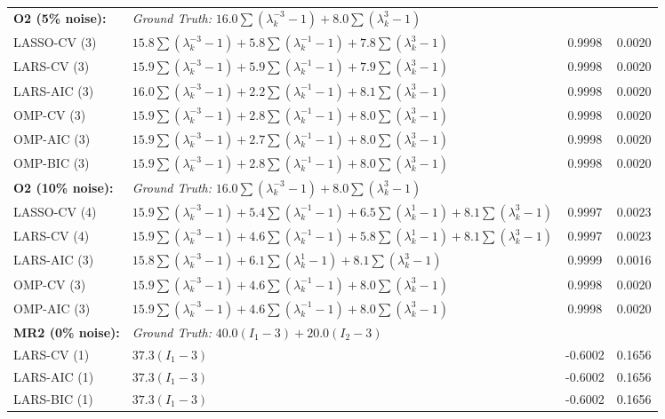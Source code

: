 \documentclass[11pt,a4paper]{article}
\begin{document}
{\begin{longtable}{@{}l l cc@{}}
\textbf{O2 (5\% noise):} & \multicolumn{3}{l}{\textit{Ground Truth: } $16.0 \sum (\lambda_k^{-3} - 1) + 8.0 \sum (\lambda_k^{3} - 1)$} \\
LASSO-CV (3) & $15.8 \sum (\lambda_k^{-3} - 1) + 5.8 \sum (\lambda_k^{-1} - 1) + 7.8 \sum (\lambda_k^{3} - 1)$ & 0.9998 & 0.0020 \\
LARS-CV (3) & $15.9 \sum (\lambda_k^{-3} - 1) + 5.9 \sum (\lambda_k^{-1} - 1) + 7.9 \sum (\lambda_k^{3} - 1)$ & 0.9998 & 0.0020 \\
LARS-AIC (3) & $16.0 \sum (\lambda_k^{-3} - 1) + 2.2 \sum (\lambda_k^{-1} - 1) + 8.1 \sum (\lambda_k^{3} - 1)$ & 0.9998 & 0.0020 \\
OMP-CV (3) & $15.9 \sum (\lambda_k^{-3} - 1) + 2.8 \sum (\lambda_k^{-1} - 1) + 8.0 \sum (\lambda_k^{3} - 1)$ & 0.9998 & 0.0020 \\
OMP-AIC (3) & $15.9 \sum (\lambda_k^{-3} - 1) + 2.7 \sum (\lambda_k^{-1} - 1) + 8.0 \sum (\lambda_k^{3} - 1)$ & 0.9998 & 0.0020 \\
OMP-BIC (3) & $15.9 \sum (\lambda_k^{-3} - 1) + 2.8 \sum (\lambda_k^{-1} - 1) + 8.0 \sum (\lambda_k^{3} - 1)$ & 0.9998 & 0.0020 \\
\midrule

\textbf{O2 (10\% noise):} & \multicolumn{3}{l}{\textit{Ground Truth: } $16.0 \sum (\lambda_k^{-3} - 1) + 8.0 \sum (\lambda_k^{3} - 1)$} \\
LASSO-CV (4) & $15.9 \sum (\lambda_k^{-3} - 1) + 5.4 \sum (\lambda_k^{-1} - 1) + 6.5 \sum (\lambda_k^{1} - 1) + 8.1 \sum (\lambda_k^{3} - 1)$ & 0.9997 & 0.0023 \\
LARS-CV (4) & $15.9 \sum (\lambda_k^{-3} - 1) + 4.6 \sum (\lambda_k^{-1} - 1) + 5.8 \sum (\lambda_k^{1} - 1) + 8.1 \sum (\lambda_k^{3} - 1)$ & 0.9997 & 0.0023 \\
LARS-AIC (3) & $15.8 \sum (\lambda_k^{-3} - 1) + 6.1 \sum (\lambda_k^{1} - 1) + 8.1 \sum (\lambda_k^{3} - 1)$ & 0.9999 & 0.0016 \\
OMP-CV (3) & $15.9 \sum (\lambda_k^{-3} - 1) + 4.6 \sum (\lambda_k^{-1} - 1) + 8.0 \sum (\lambda_k^{3} - 1)$ & 0.9998 & 0.0020 \\
OMP-AIC (3) & $15.9 \sum (\lambda_k^{-3} - 1) + 4.6 \sum (\lambda_k^{-1} - 1) + 8.0 \sum (\lambda_k^{3} - 1)$ & 0.9998 & 0.0020 \\
\midrule

\textbf{MR2 (0\% noise):} & \multicolumn{3}{l}{\textit{Ground Truth: } $40.0 (I_1 - 3) + 20.0 (I_2 - 3)$} \\
LARS-CV (1) & $37.3 (I_1 - 3)$ & -0.6002 & 0.1656 \\
LARS-AIC (1) & $37.3 (I_1 - 3)$ & -0.6002 & 0.1656 \\
LARS-BIC (1) & $37.3 (I_1 - 3)$ & -0.6002 & 0.1656 \\
\midrule


\end{longtable}}
\end{document}
